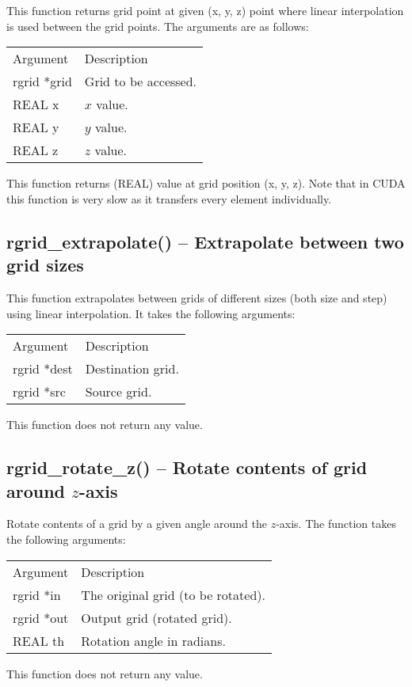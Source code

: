 \documentclass[12pt,letterpaper]{report}
\begin{document}
This function returns grid point at given (x, y, z) point where linear interpolation is used between the grid points. The arguments are as follows:
\begin{longtable}{p{} p{}}
Argument & Description\\
\cline{1-2}
rgrid *grid & Grid to be accessed.\\
REAL x & $x$ value.\\
REAL y & $y$ value.\\
REAL z & $z$ value.\\
\end{longtable}
\noindent
This function returns (REAL) value at grid position (x, y, z). Note that in CUDA this function is very slow as it transfers every element individually.

\subsection{rgrid\_extrapolate() -- Extrapolate between two grid sizes}

This function extrapolates between grids of different sizes (both size and step) using linear interpolation. It takes the following arguments:
\begin{longtable}{p{} p{}}
Argument & Description\\
\cline{1-2}
rgrid *dest & Destination grid.\\
rgrid *src  & Source grid.\\
\end{longtable}
\noindent
This function does not return any value. 

\subsection{rgrid\_rotate\_z() -- Rotate contents of grid around $z$-axis}

Rotate contents of a grid by a given angle around the $z$-axis. The function takes the following arguments:
\begin{longtable}{p{} p{}}
Argument & Description\\
\cline{1-2}
rgrid *in & The original grid (to be rotated).\\                                                                                
rgrid *out & Output grid (rotated grid).\\
REAL th & Rotation angle in radians.\\
\end{longtable}
\noindent
This function does not return any value. 
\end{document}
